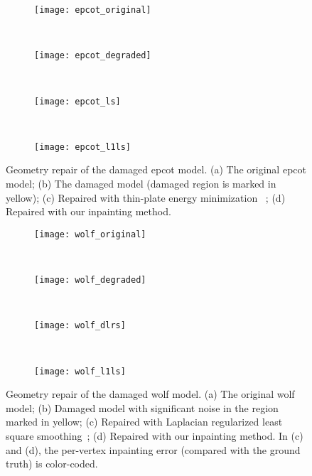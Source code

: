 \begin{figure}
    \centering
    \begin{subfigure}[b]{0.23\linewidth}
        \texttt{[image: epcot\_original]}
        \caption{}
    \end{subfigure}%
    ~
    \begin{subfigure}[b]{0.23\linewidth}
        \texttt{[image: epcot\_degraded]}
        \caption{}
    \end{subfigure}
    ~
    \begin{subfigure}[b]{0.23\linewidth}
        \texttt{[image: epcot\_ls]}
        \caption{}
    \end{subfigure}
    ~
    \begin{subfigure}[b]{0.23\linewidth}
        \texttt{[image: epcot\_l1ls]}
        \caption{}
    \end{subfigure}
    \caption {Geometry repair of the damaged epcot model. (a) The original epcot model;
    (b) The damaged model (damaged region is marked in yellow); (c) Repaired with thin-plate
    energy minimization ~\cite{Bac2008}; (d) Repaired with our inpainting method.}
\label{fig:repair:epcot}
\end{figure}

\begin{figure}
    \centering
    \begin{subfigure}[b]{0.35\linewidth}
        \texttt{[image: wolf\_original]}
        \caption{}
    \end{subfigure}%
    ~
    \begin{subfigure}[b]{0.35\linewidth}
        \texttt{[image: wolf\_degraded]}
        \caption{}
    \end{subfigure}
    \\
    \begin{subfigure}[b]{0.35\linewidth}
        \texttt{[image: wolf\_dlrs]}
        \caption{}
    \end{subfigure}
    ~
    \begin{subfigure}[b]{0.35\linewidth}
        \texttt{[image: wolf\_l1ls]}
        \caption{}
    \end{subfigure}
    \caption {Geometry repair of the damaged wolf model.
         (a) The original wolf model; (b) Damaged model with significant noise in the region marked in yellow;
         (c) Repaired with Laplacian regularized least square smoothing~\cite{Nealen2006};
         (d) Repaired with our inpainting method. In (c) and (d), the per-vertex inpainting error (compared with the ground truth)
          is color-coded. }
\label{fig:repair:wolf}
\end{figure}

